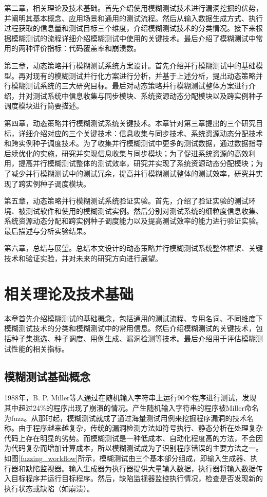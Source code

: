 \documentclass[master]{thesis-uestc}
\begin{document}
第二章，相关理论及技术基础。首先介绍使用模糊测试技术进行漏洞挖掘的优势，并阐明其基本概念、应用场景和通用的测试流程。然后从输入数据生成方式、执行过程获取的信息量和测试目标三个维度，介绍模糊测试技术的分类情况。接下来根据模糊测试的流程详细介绍模糊测试中使用的关键技术。最后介绍了模糊测试中常用的两种评价指标：代码覆盖率和崩溃数。

第三章，动态策略并行模糊测试系统方案设计。首先介绍并行模糊测试中的基础模型。再对现有的模糊测试并行化方案进行分析，并基于上述分析，提出动态策略并行模糊测试系统的三大研究目标。最后对动态策略并行模糊测试整体方案进行介绍，并对测试系统中信息收集与同步模块、系统资源动态分配模块以及跨实例种子调度模块进行简要描述。

第四章，动态策略并行模糊测试系统关键技术。本章针对第三章提出的三个研究目标，详细介绍对应的三个关键技术：信息收集与同步技术、系统资源动态分配技术和跨实例种子调度技术。为了收集并行模糊测试中更多的测试数据，通过数据指导后续优化的实施，研究并实现信息收集与同步模块；为了促进系统资源的高效利用，提高并行模糊测试整体的测试效率，研究并实现了系统资源动态分配模块；为了减少并行模糊测试中的测试冗余，提高并行模糊测试整体的测试效率，研究并实现了跨实例种子调度模块。

第五章，动态策略并行模糊测试系统验证实验。首先，介绍了验证实验的测试环境、被测试软件和使用的模糊测试实例。然后分别对测试系统的细粒度信息收集、系统资源动态分配和跨实例种子调度能力以及提高测试效率的能力进行验证实验。最后描述与分析实验结果。

第六章，总结与展望。总结本文设计的动态策略并行模糊测试系统整体框架、关键技术和验证实验，并对未来的研究方向进行展望。

\chapter{相关理论及技术基础}
本章首先介绍模糊测试的基础概念，包括通用的测试流程、专用名词、不同维度下模糊测试技术的分类和模糊测试中的常用信息。然后介绍模糊测试的关键技术，包括种子集挑选、种子调度、用例生成、漏洞检测等技术。最后介绍用于评估模糊测试性能的相关指标。

\section{模糊测试基础概念}
1988年，B. P. Miller等人通过在随机输入字符串上运行90个程序进行测试，发现其中超过24\%的程序出现了崩溃的情况。产生随机输入字符串的程序被Miller命名为fuzz。从那时起，模糊测试就成了通过海量测试用例来挖掘程序漏洞的技术名称。由于程序越来越复杂，传统的漏洞检测方法如符号执行、静态分析在处理复杂代码上存在明显的劣势。而模糊测试是一种低成本、自动化程度高的方法，不会因为代码复杂而增加计算成本，所以模糊测试成为了识别程序错误的主要方法之一。如图\ref{fuzzing_workflow}所示，模糊测试由三个基本部分组成，即输入生成器、执行器和缺陷监视器。输入生成器为执行器提供大量输入数据，执行器将输入数据传入目标程序并运行目标程序。然后，缺陷监视器监控执行情况，检查是否发现新的执行状态或缺陷（如崩溃）。
\end{document}
